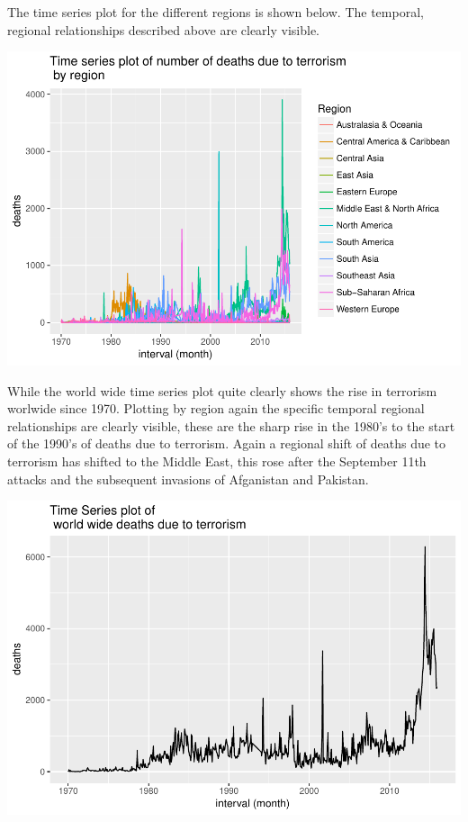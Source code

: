 \documentclass[]{article}
\begin{document}
The time series plot for the different regions is shown below. The
temporal, regional relationships described above are clearly visible.

\includegraphics{Peters_experiment_markdown_files/figure-latex/unnamed-chunk-2-1.pdf}

While the world wide time series plot quite clearly shows the rise in
terrorism worlwide since 1970. Plotting by region again the specific
temporal regional relationships are clearly visible, these are the sharp
rise in the 1980's to the start of the 1990's of deaths due to
terrorism. Again a regional shift of deaths due to terrorism has shifted
to the Middle East, this rose after the September 11th attacks and the
subsequent invasions of Afganistan and Pakistan.

\includegraphics{Peters_experiment_markdown_files/figure-latex/unnamed-chunk-3-1.pdf}
\end{document}
